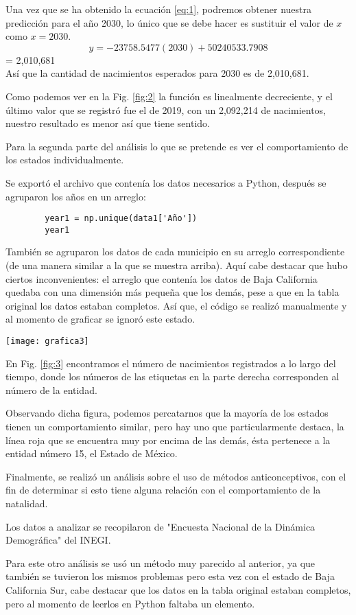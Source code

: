 \documentclass[11pt]{article}
\begin{document}
\begin{multicols}{2}
	Una vez que se ha obtenido la ecuación \ref{eq:1}, podremos obtener nuestra predicción para el año 2030, lo único que se debe hacer es sustituir el valor de $x$ como $x=2030$.
	\begin{equation}
		y = -23758.5477 (2030) + 50240533.7908
	\end{equation}
	\hspace{0.5cm} = 2,010,681\\
	Así que la cantidad de nacimientos esperados para 2030 es de 2,010,681.\par 
	Como podemos ver en la Fig. \ref{fig:2} la función es linealmente decreciente, y el último valor que se registró fue el de 2019, con un 2,092,214 de nacimientos, nuestro resultado es menor así que tiene sentido.\par 
	Para la segunda parte del análisis lo que se pretende es ver el comportamiento de los estados individualmente.\par 
	Se exportó el archivo que contenía los datos necesarios a Python, después se agruparon los años en un arreglo:
	\begin{verbatim}
		year1 = np.unique(data1['Año'])
		year1
	\end{verbatim}
	También se agruparon los datos de cada municipio en su arreglo correspondiente (de una manera similar a la que se muestra arriba). Aquí cabe destacar que hubo ciertos inconvenientes: el arreglo que contenía los datos de Baja California quedaba con una dimensión más pequeña que los demás, pese a que en la tabla original los datos estaban completos. Así que, el código se realizó manualmente y al momento de graficar se ignoró este estado.\par 
	
	\texttt{[image: grafica3]}\label{fig:3}
	
	En Fig. \ref{fig:3} encontramos el número de nacimientos registrados a lo largo del tiempo, donde los números de las etiquetas en la parte derecha corresponden al número de la entidad.\par 
	Observando dicha figura, podemos percatarnos que la mayoría de los estados tienen un comportamiento similar, pero hay uno que particularmente destaca, la línea roja que se encuentra muy por encima de las demás, ésta pertenece a la entidad número 15, el Estado de México.\par 
	Finalmente, se realizó un análisis sobre el uso de métodos anticonceptivos, con el fin de determinar si esto tiene alguna relación con el comportamiento de la natalidad.\par 
	Los datos a  analizar se recopilaron de "Encuesta Nacional de la Dinámica Demográfica" del INEGI.\par 
	Para este otro análisis se usó un método muy parecido al anterior, ya que también se tuvieron los mismos problemas pero esta vez con el estado de Baja California Sur, cabe destacar que los datos en la tabla original estaban completos, pero al momento de leerlos en Python faltaba un elemento.\par 
	

\end{multicols}
\end{document}
